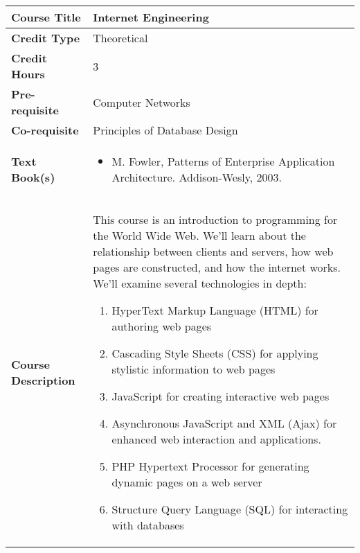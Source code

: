 \documentclass[11pt]{article}
\begin{document}
\begin{table}[h!]
\begin{tabular}{|l|l|}
\hline
\textbf{Course Title}       &   Internet Engineering\\ \hline
\textbf{Credit Type}        &   Theoretical \\ \hline
\textbf{Credit Hours}       &  3 \\ \hline
\textbf{Pre-requisite}       &  Computer Networks \\ \hline
\textbf{Co-requisite}       &  Principles of Database Design \\ \hline
\textbf{Text Book(s)}       & \begin{minipage}{.70\textwidth}
\begin{itemize} \itemsep-0.4em
	\vspace{3mm}
	\item M. Fowler, Patterns of Enterprise Application Architecture. Addison-Wesly, 2003.
	\vspace{3mm}
\end{itemize}
\end{minipage}\\ \hline
\textbf{Course Description} & \begin{minipage}{.70\textwidth}
\vspace{3mm}
This course is an introduction to programming for the World Wide Web. We’ll learn about the relationship
between clients and servers, how web pages are constructed, and how the internet works. We’ll examine several
technologies in depth: \newline

\begin{enumerate}
  \item  HyperText Markup Language (HTML) for authoring web pages
  \item Cascading Style Sheets (CSS) for applying stylistic information to web pages
  \item  JavaScript for creating interactive web pages
  \item Asynchronous JavaScript and XML (Ajax) for enhanced web interaction and applications.
  \item  PHP Hypertext Processor for generating dynamic pages on a web server
  \item   Structure Query Language (SQL) for interacting with databases
\end{enumerate}

\vspace{3mm}
\end{minipage} \\ \hline
\end{tabular}
\end{table}
\end{document}

